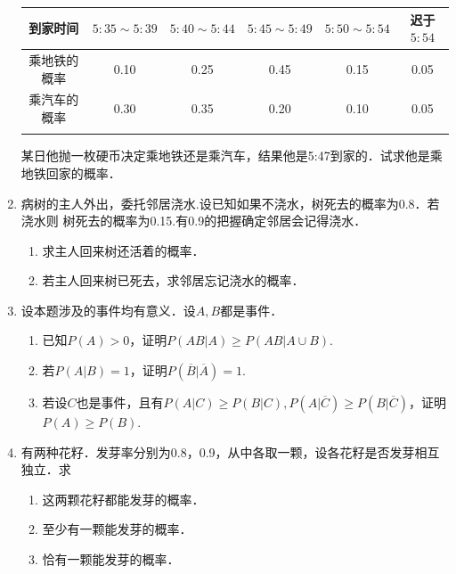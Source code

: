 \documentclass[10pt,a4paper]{article}
\begin{document}
\begin{enumerate}
    \begin{table}[h]\centering        
        \begin{tabular*}{\hsize}{cccccc}
        \hline
        \multicolumn{1}{c|}{到家时间}   & $5:35 \sim 5:39$     & $5:40 \sim 5:44$     & $5:45 \sim 5:49$     & $5:50 \sim 5:54$     & 迟于$5:54$             \\ \hline
        \multicolumn{1}{c|}{乘地铁的概率} & 0.10                 & 0.25                 & 0.45                 & 0.15                 & 0.05                 \\ \hline
        \multicolumn{1}{c|}{乘汽车的概率} & 0.30                 & 0.35                 & 0.20                 & 0.10                 & 0.05                 \\ \hline
        \multicolumn{1}{l}{}        & \multicolumn{1}{l}{} & \multicolumn{1}{l}{} & \multicolumn{1}{l}{} & \multicolumn{1}{l}{} & \multicolumn{1}{l}{}
        \end{tabular*}   
    \end{table}
    \vspace{-1cm}
    某日他抛一枚硬币决定乘地铁还是乘汽车，结果他是5:47到家的．试求他是乘地铁回家的概率．


    \item 病树的主人外出，委托邻居浇水.设已知如果不浇水，树死去的概率为0.8．若浇水则
    树死去的概率为0.15.有0.9的把握确定邻居会记得浇水．
    \begin{enumerate}
        \item 求主人回来树还活着的概率．
        \item 若主人回来树已死去，求邻居忘记浇水的概率．
    \end{enumerate}


    \item 设本题涉及的事件均有意义．设$A,B$都是事件．
    \begin{enumerate}
        \item 已知$P(A)>0$，证明$P(AB|A)\geq P(AB|A\cup B)$.
        \item 若$P(A|B)=1$，证明$P(\overline{B}|\overline{A})=1$.
        \item 若设$C$也是事件，且有$P(A|C)\geq P(B|C),P(A|\overline{C})\geq P(B|\overline{C})$，证明$P(A)\geq P(B)$.
    \end{enumerate}



    \item 有两种花籽．发芽率分别为0.8，0.9，从中各取一颗，设各花籽是否发芽相互独立．求
    \begin{enumerate}
        \item 这两颗花籽都能发芽的概率．
        \item 至少有一颗能发芽的概率．
        \item 恰有一颗能发芽的概率．
    \end{enumerate}




\end{enumerate}
\end{document}
